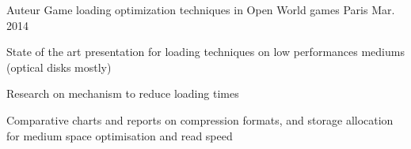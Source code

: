 

\begin{cventries}

  \cventry
    {Auteur} %
    {Game loading optimization techniques in Open World games} %
    {Paris} %
    {Mar. 2014} %
    {
      \begin{cvitems} %
        \item {State of the art presentation for loading techniques on low performances mediums (optical disks mostly)}
        \item {Research on mechanism to reduce loading times}
        \item {Comparative charts and reports on compression formats, and storage allocation for medium space optimisation and read speed}
      \end{cvitems}
    }


\end{cventries}
